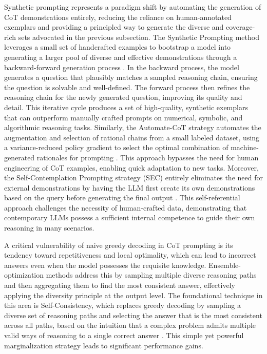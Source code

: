 \documentclass[11pt]{article}
\begin{document}
Synthetic prompting represents a paradigm shift by automating the generation of CoT demonstrations entirely, reducing the reliance on human-annotated exemplars and providing a principled way to generate the diverse and coverage-rich sets advocated in the previous subsection. The Synthetic Prompting method leverages a small set of handcrafted examples to bootstrap a model into generating a larger pool of diverse and effective demonstrations through a backward-forward generation process \cite{ref147}. In the backward process, the model generates a question that plausibly matches a sampled reasoning chain, ensuring the question is solvable and well-defined. The forward process then refines the reasoning chain for the newly generated question, improving its quality and detail. This iterative cycle produces a set of high-quality, synthetic exemplars that can outperform manually crafted prompts on numerical, symbolic, and algorithmic reasoning tasks. Similarly, the Automate-CoT strategy automates the augmentation and selection of rational chains from a small labeled dataset, using a variance-reduced policy gradient to select the optimal combination of machine-generated rationales for prompting \cite{ref148}. This approach bypasses the need for human engineering of CoT examples, enabling quick adaptation to new tasks. Moreover, the Self-Contemplation Prompting strategy (SEC) entirely eliminates the need for external demonstrations by having the LLM first create its own demonstrations based on the query before generating the final output \cite{ref5}. This self-referential approach challenges the necessity of human-crafted data, demonstrating that contemporary LLMs possess a sufficient internal competence to guide their own reasoning in many scenarios.

A critical vulnerability of naive greedy decoding in CoT prompting is its tendency toward repetitiveness and local optimality, which can lead to incorrect answers even when the model possesses the requisite knowledge. Ensemble-optimization methods address this by sampling multiple diverse reasoning paths and then aggregating them to find the most consistent answer, effectively applying the diversity principle at the output level. The foundational technique in this area is Self-Consistency, which replaces greedy decoding by sampling a diverse set of reasoning paths and selecting the answer that is the most consistent across all paths, based on the intuition that a complex problem admits multiple valid ways of reasoning to a single correct answer \cite{ref149}. This simple yet powerful marginalization strategy leads to significant performance gains.
\end{document}

